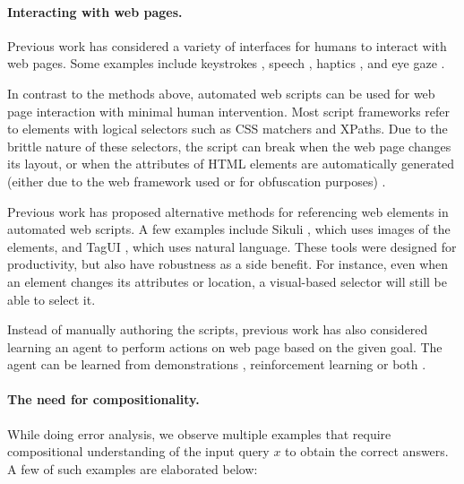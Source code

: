 \paragraph{Interacting with web pages.}
Previous work has considered a variety of interfaces
for humans to interact with web pages.
Some examples include
keystrokes \cite{spalteholz2008keysurf},
speech \cite{ashok2014wizard},
haptics \cite{yu2005haptics},
and eye gaze \cite{kumar2007eyepoint}.

In contrast to the methods above,
automated web scripts can be used for web page interaction
with minimal human intervention.
Most script frameworks refer to elements with logical selectors
such as CSS matchers and XPaths.
Due to the brittle nature of these selectors,
the script can break when the web page changes its layout,
or when the attributes of HTML elements are automatically generated
(either due to the web framework used or for obfuscation purposes)
\cite{hammoudi2016why}.

Previous work has proposed alternative methods
for referencing web elements in automated web scripts.
A few examples include Sikuli \cite{yeh2009sikuli},
which uses images of the elements,
and TagUI \cite{soh2017tagui},
which uses natural language.
These tools were designed for productivity,
but also have robustness as a side benefit.
For instance, even when an element changes its attributes
or location, a visual-based selector
will still be able to select it.

Instead of manually authoring the scripts,
previous work has also considered learning an agent
to perform actions on web page based on the given goal.
The agent can be learned
from demonstrations \cite{allen2007plow},
reinforcement learning
\cite{branavan08annotation,branavan09reinforcement}
or both \cite{shi2017wob,liu2018workflow}.

\paragraph{The need for compositionality.}

While doing error analysis,
we observe multiple examples that require
compositional understanding of the input query $x$
to obtain the correct answers.
A few of such examples are elaborated below:


